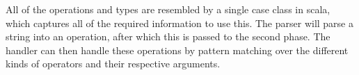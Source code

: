 \par
All of the operations and types are resembled by a single case class in scala,
which captures all of the required information to use this. The parser will
parse a string into an operation, after which this is passed to the second
phase. The handler can then handle these operations by pattern matching over the
different kinds of operators and their respective arguments.



 

